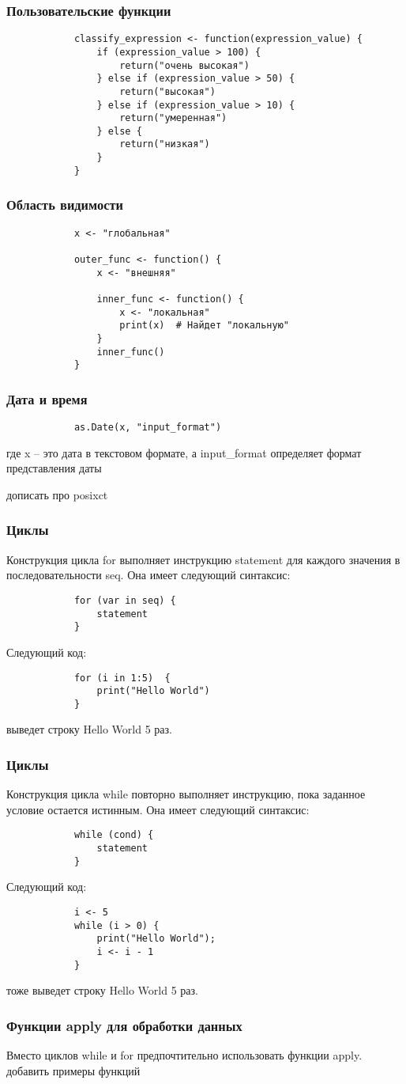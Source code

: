 \documentclass[10pt]{beamer}
\begin{document}
	\begin{frame}[fragile]
		\frametitle{Пользовательские функции}
		\begin{verbatim}
			classify_expression <- function(expression_value) {
				if (expression_value > 100) {
					return("очень высокая")
				} else if (expression_value > 50) {
					return("высокая")
				} else if (expression_value > 10) {
					return("умеренная") 
				} else {
					return("низкая")
				}
			}
		\end{verbatim}
	\end{frame}
	
	\begin{frame}[fragile]
		\frametitle{Область видимости}
		\begin{verbatim}
			x <- "глобальная"
			
			outer_func <- function() {
				x <- "внешняя"
				
				inner_func <- function() {
					x <- "локальная"
					print(x)  # Найдет "локальную"
				}
				inner_func()
			}
		\end{verbatim}
	\end{frame}
	
	\begin{frame}[fragile]
		\frametitle{Дата и время}
		\begin{verbatim}
			as.Date(x, "input_format")
		\end{verbatim} 	
		где x – это дата в текстовом формате, а input\_format определяет формат представления даты
		
		дописать про posixct
	\end{frame}
	
	\begin{frame}[fragile]
		\frametitle{Циклы}
		Конструкция цикла for выполняет инструкцию statement для каждого значения в последовательности seq. Она имеет следующий синтаксис:
		\begin{verbatim}
			for (var in seq) {
				statement
			}
		\end{verbatim}
		Следующий код:
		\begin{verbatim}
			for (i in 1:5)  {
				print("Hello World")
			}
		\end{verbatim}
		выведет строку Hello World 5 раз.
	\end{frame}
	
	\begin{frame}[fragile]
		\frametitle{Циклы}
		Конструкция цикла while повторно выполняет инструкцию, пока заданное условие остается истинным. Она имеет следующий синтаксис:
		\begin{verbatim}
			while (cond) {
				statement
			}
		\end{verbatim}
		Следующий код:
		\begin{verbatim}	
			i <- 5
			while (i > 0) {
				print("Hello World"); 
				i <- i - 1
			}
		\end{verbatim}	
		тоже выведет строку Hello World 5 раз.
	\end{frame}
	
    \begin{frame}
	    \frametitle{Функции apply для обработки данных}
	Вместо циклов while и for предпочтительно использовать функции apply.
	добавить примеры функций
    \end{frame}	
	
	
\end{document}
